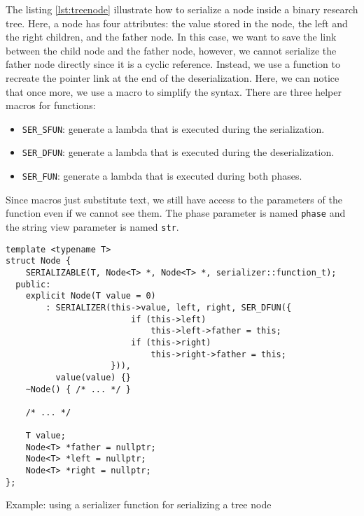 The listing \ref{lst:treenode} illustrate how to serialize a node inside a
binary research tree. Here, a node has four attributes: the value stored in the
node, the left and the right children, and the father node. In this case, we
want to save the link between the child node and the father node, however, we
cannot serialize the father node directly since it is a cyclic reference.
Instead, we use a function to recreate the pointer link at the end of the
deserialization. Here, we can notice that once more, we use a macro to simplify
the syntax. There are three helper macros for functions:

\begin{itemize}
  \item \texttt{SER\_SFUN}: generate a lambda that is executed during the
    serialization.
  \item \texttt{SER\_DFUN}: generate a lambda that is executed during the
    deserialization.
  \item \texttt{SER\_FUN}: generate a lambda that is executed during both
    phases.
\end{itemize}

Since macros just substitute text, we still have access to the parameters of the
function even if we cannot see them. The phase parameter is named \texttt{phase}
and the string view parameter is named \texttt{str}.

\begin{listing}[ht!]
\begin{verbatim}
template <typename T>
struct Node {
    SERIALIZABLE(T, Node<T> *, Node<T> *, serializer::function_t);
  public:
    explicit Node(T value = 0)
        : SERIALIZER(this->value, left, right, SER_DFUN({
                         if (this->left)
                             this->left->father = this;
                         if (this->right)
                             this->right->father = this;
                     })),
          value(value) {}
    ~Node() { /* ... */ }

    /* ... */

    T value;
    Node<T> *father = nullptr;
    Node<T> *left = nullptr;
    Node<T> *right = nullptr;
};
\end{verbatim}
\caption{Example: using a serializer function for serializing a tree node}
\label{lst:treenode}
\end{listing}

